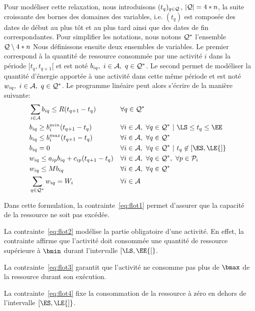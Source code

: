 Pour modéliser cette relaxation, nous introduisons $(t_q)_{q \in {\cal Q}}$,
$| {\cal Q} | = 4*n$, la suite croissante des bornes des domaines des
variables, i.e. $(t_q)$ est composée des dates de début au plus tôt et
au plus tard ainsi que des dates de fin correspondantes. Pour
simplifier les notations, nous notons ${\cal Q}^* $ l'ensemble ${\cal Q}
\setminus{4*n}$ Nous définissons ensuite deux ensembles de
variables. Le premier correspond à la quantité de ressource consommée 
par une activité $i$ dans la période $[t_q,t_{q+1}[$ et est noté
$b_{iq},\ i \in {\cal A},\ q \in {\cal Q}^*$. Le second permet de modéliser la
quantité d'énergie apportée à une activité dans cette même période et
est noté $w_{iq},\ i \in {\cal A},\ q \in {\cal Q}^*$. Le programme linéaire peut
alors s'écrire de la manière suivante:
\begin{align}
  &\sum_{i \in \A} b_{iq} \le R(t_{q+1}- t_q) & & 
  \forall q \in \Q^* \label{eq:flot1}\\
  &b_{iq} \ge b_i^{min}(t_{q+1}-t_q) & & \forall i \in \A,
  \ \forall q \in \Q^*\ | \ \LS \le t_q \le \EE \label{eq:flot2}\\
  &b_{iq} \le b_i^{max} (t_{q+1} - t_q) & &
  \forall i \in \A,\ \forall q \in \Q^* \label{eq:flot3}\\
  &b_{iq}=0 & & \forall i \in \A, \ 
  \forall q \in \Q^*\  |\ t_q \not\in [\ES,\LE{]} \label{eq:flot4}\\  
  &w_{iq} \le a_{ip}b_{iq}+c_{ip}(t_{q+1}-t_q) & &
  \forall i \in \A, \ \forall q \in \Q^*,\  \forall p \in \P_i \label{eq:flot5}\\
  &w_{iq} \le Mb_{iq} & &
  \forall i \in \A,\ \forall q \in \Q^*\ \label{eq:flot6}\\
  &\sum_{q\in \Q^*} w_{iq} = W_i  & &
  \forall i \in \A \label{eq:flot7}
  \end{align}

Dans cette formulation, la contrainte~\eqref{eq:flot1} permet
d'assurer que la capacité de la ressource ne soit pas excédée. 

La contrainte~\eqref{eq:flot2} modélise la partie
obligatoire d'une activité. En effet, la contrainte affirme que
l'activité doit consommée une quantité de ressource supérieure à
$\bmin$ durant l'intervalle $[\LS,\EE{[}$.

La contrainte~\eqref{eq:flot3}  garantit que l'activité ne consomme
pas plus de $\bmax$ de la ressource durant son exécution. 

La contrainte~\eqref{eq:flot4} fixe la consommation de la ressource à
zéro en dehors de l'intervalle $[\ES,\LE{]}$.

